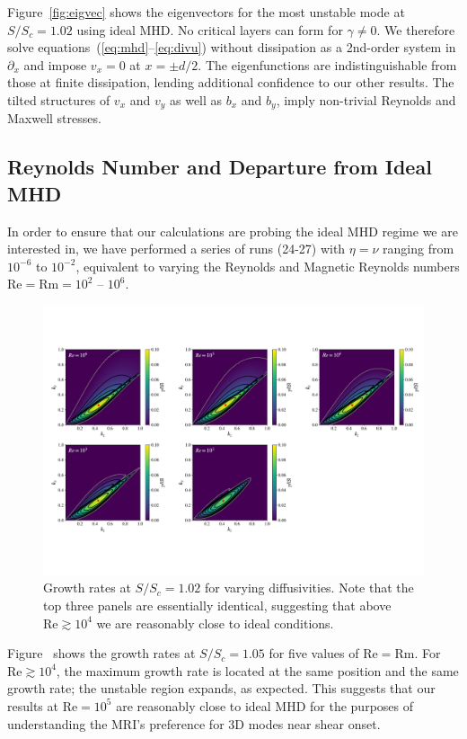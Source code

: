 \documentclass[openacc]{rsproca_new}%
\newcommand{\SSC}{S/S_{c}}
\newcommand{\Reyn}{\mathrm{Re}}
\newcommand{\Reym}{\mathrm{Rm}}
\begin{document}
Figure~\ref{fig:eigvec} shows the eigenvectors for the most unstable mode at $\SSC=1.02$ using ideal MHD. 
No critical layers can form for $\gamma\ne0$.
We therefore solve equations~(\ref{eq:mhd}--\ref{eq:divu}) without dissipation as a 2nd-order system in $\partial_{x}$ and impose $v_{x}=0$ at $x=\pm{d/2}$.
The eigenfunctions are indistinguishable from those at finite dissipation, lending additional confidence to our other results.
The tilted structures of $v_{x}$ and $v_{y}$ as well as $b_{x}$ and $b_{y}$, imply non-trivial Reynolds and Maxwell stresses.

\subsection{Reynolds Number and Departure from Ideal MHD}
\label{sec:reyn}

In order to ensure that our calculations are probing the ideal MHD regime we are interested in, we have performed a series of runs (24-27) with $\eta = \nu$ ranging from $10^{-6}$ to $10^{-2}$, equivalent to varying the Reynolds and Magnetic Reynolds numbers $\Reyn = \Reym = 10^2$ -- $10^6$.
\begin{figure}[h!]
  \centering
  \includegraphics[width=\textwidth]{re_plots.pdf}
  \caption{Growth rates at $\SSC = 1.02$ for varying diffusivities. Note that the top three panels are essentially identical, suggesting that above $\Reyn \gtrsim 10^4$ we are reasonably close to ideal conditions.}
  \label{fig:reynolds}
\end{figure}
Figure~\pageref{fig:reynolds} shows the growth rates at $\SSC=1.05$ for five values of $\Reyn = \Reym$.
For $\Reyn \gtrsim 10^4$, the maximum growth rate is located at the same position and the same growth rate; the unstable region expands, as expected.
This suggests that our results at $\Reyn = 10^5$ are reasonably close to ideal MHD for the purposes of understanding the MRI's preference for 3D modes near shear onset.
\end{document}
